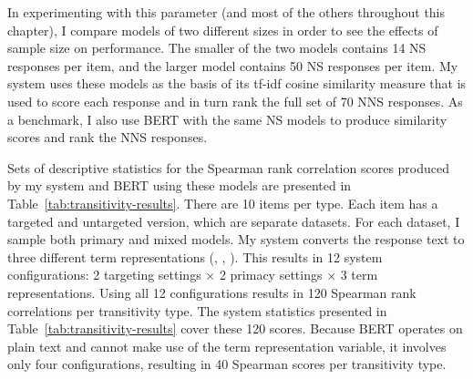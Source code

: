In experimenting with this parameter (and most of the others throughout this chapter), I compare models of two different sizes in order to see the effects of sample size on performance. The smaller of the two models contains 14 NS responses per item, and the larger model contains 50 NS responses per item. My system uses these models as the basis of its tf-idf cosine similarity measure that is used to score each response and in turn rank the full set of 70 NNS responses. As a benchmark, I also use BERT with the same NS models to produce similarity scores and rank the NNS responses.

Sets of descriptive statistics for the Spearman rank correlation scores produced by my system and BERT using these models are presented in Table~\ref{tab:transitivity-results}. There are 10 items per type. Each item has a targeted and untargeted version, which are separate datasets. For each dataset, I sample both primary and mixed models. My system converts the response text to three different term representations (, , ). This results in 12 system configurations: 2 targeting settings $\times$ 2 primacy settings $\times$ 3 term representations. Using all 12 configurations results in 120 Spearman rank correlations per transitivity type. The system statistics presented in Table~\ref{tab:transitivity-results} cover these 120 scores. Because BERT operates on plain text and cannot make use of the term representation variable, it involves only four configurations, resulting in 40 Spearman scores per transitivity type.

